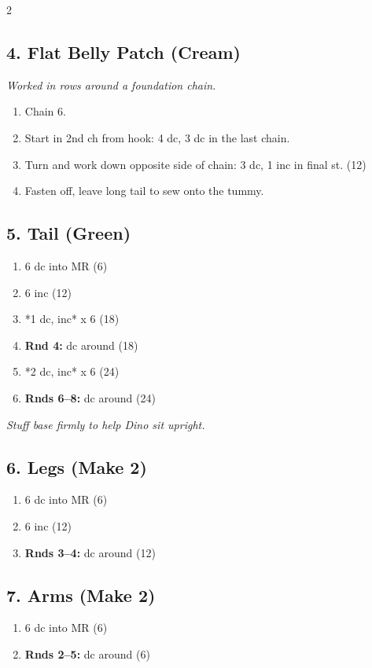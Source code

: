 \begin{multicols}{2}
\subsection*{4. Flat Belly Patch (Cream)}
\textit{Worked in rows around a foundation chain.}
\begin{enumerate}[noitemsep,leftmargin=*]
    \item Chain 6.
    \item Start in 2nd ch from hook: 4 dc, 3 dc in the last chain.
    \item Turn and work down opposite side of chain: 3 dc, 1 inc in final st. (12)
    \item Fasten off, leave long tail to sew onto the tummy.
\end{enumerate}

\subsection*{5. Tail (Green)}
\begin{enumerate}[noitemsep,leftmargin=*]
    \item 6 dc into MR (6)
    \item 6 inc (12)
    \item *1 dc, inc* x 6 (18)
    \item \textbf{Rnd 4:} dc around (18)
    \item *2 dc, inc* x 6 (24)
    \item \textbf{Rnds 6--8:} dc around (24)
\end{enumerate}
\textit{Stuff base firmly to help Dino sit upright.}

\subsection*{6. Legs (Make 2)}
\begin{enumerate}[noitemsep,leftmargin=*]
    \item 6 dc into MR (6)
    \item 6 inc (12)
    \item \textbf{Rnds 3--4:} dc around (12)
\end{enumerate}

\subsection*{7. Arms (Make 2)}
\begin{enumerate}[noitemsep,leftmargin=*]
    \item 6 dc into MR (6)
    \item \textbf{Rnds 2--5:} dc around (6)
\end{enumerate}


\end{multicols}

